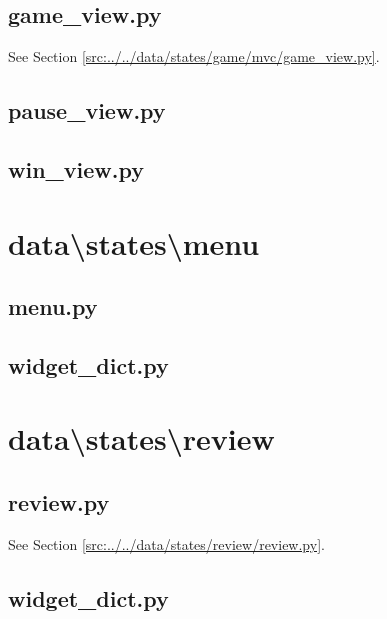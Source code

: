 \documentclass[../main/main.tex]{subfiles}
\begin{document}
\subsection{game\_view.py}
See Section \ref{src:../../data/states/game/mvc/game_view.py}.

\subsection{pause\_view.py}

\label{src:data/states/game/mvc/pause_view.py}

\subsection{win\_view.py}

\label{src:data/states/game/mvc/win_view.py}

\section{data\textbackslash states\textbackslash menu}
\subsection{menu.py}

\label{src:data/states/menu/menu.py}

\subsection{widget\_dict.py}

\label{src:data/states/menu/widget_dict.py}

\section{data\textbackslash states\textbackslash review}
\subsection{review.py}
See Section \ref{src:../../data/states/review/review.py}.

\subsection{widget\_dict.py}

\label{src:data/states/review/widget_dict.py}
\end{document}
